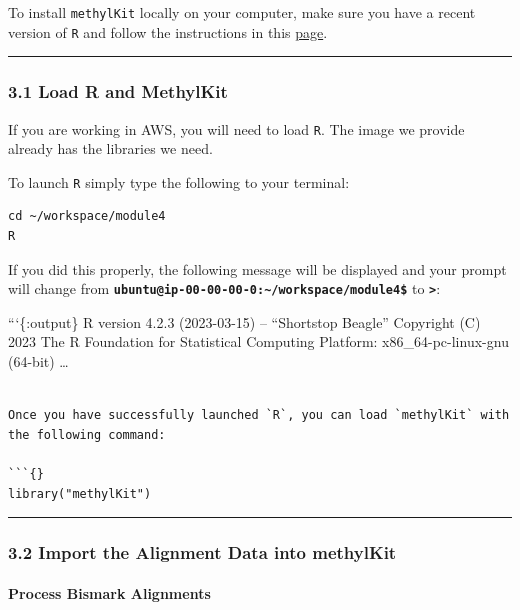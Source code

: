 \documentclass[
]{book}
\begin{document}
To install \texttt{methylKit} locally on your computer, make sure you have a recent version of \texttt{R} and
follow the instructions in this \href{https://bioconductor.org/packages/release/bioc/html/methylKit.html}{page}.

\begin{center}\rule{0.5\linewidth}{0.5pt}\end{center}

\subsubsection{3.1 Load R and MethylKit}\label{load-r-and-methylkit}

If you are working in AWS, you will need to load \texttt{R}. The image we provide already has the libraries we need.

To launch \texttt{R} simply type the following to your terminal:

\begin{verbatim}
cd ~/workspace/module4
R
\end{verbatim}

If you did this properly, the following message will be displayed and your prompt will change from \textbf{\texttt{ubuntu@ip-00-00-00-0:\textasciitilde{}/workspace/module4\$}} to \textbf{\texttt{\textgreater{}}}:

```\{:output\}
R version 4.2.3 (2023-03-15) -- ``Shortstop Beagle''
Copyright (C) 2023 The R Foundation for Statistical Computing
Platform: x86\_64-pc-linux-gnu (64-bit)
\ldots{}

\begin{verbatim}

Once you have successfully launched `R`, you can load `methylKit` with the following command: 

```{}
library("methylKit") 
\end{verbatim}

\begin{center}\rule{0.5\linewidth}{0.5pt}\end{center}

\subsubsection{3.2 Import the Alignment Data into methylKit}\label{import-the-alignment-data-into-methylkit}

\paragraph{Process Bismark Alignments}\label{process-bismark-alignments}
\end{document}
